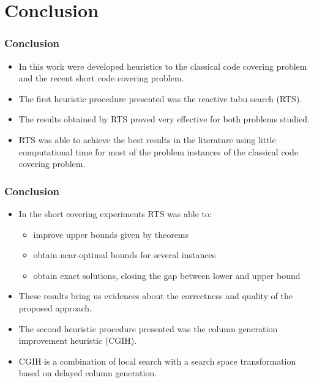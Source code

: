 \documentclass{beamer}
\begin{document}
\section{Conclusion}

\begin{frame}
  \frametitle{Conclusion}
{
	
\begin{itemize}
	\item<1-> In this work were developed heuristics to the classical code covering problem and the recent short code covering problem.
	\item<2-> The first heuristic procedure presented was the reactive tabu search (RTS).
	\item<3-> The results obtained by RTS proved very effective for both problems studied.
	\item<4-> RTS was able to achieve the best results in the literature using little computational time for most of the problem instances of the classical code covering problem.	
\end{itemize}

}
\end{frame}

\begin{frame}
  \frametitle{Conclusion}
{
	
\begin{itemize}
  	\item<1-> In the short covering experiments RTS was able to:
	\begin{itemize}
		\item<2-> improve upper bounds given by theorems
		\item<3-> obtain near-optimal bounds for several instances
		\item<4-> obtain exact solutions, closing the gap between lower and upper bound
	\end{itemize} 	
	\item<5-> These results bring us evidences about the correctness and quality of the proposed approach.	
	\item<6-> The second heuristic procedure presented was the column generation improvement heuristic (CGIH).
	\item<7-> CGIH is a combination of local search with a search space transformation based on delayed column generation.	
\end{itemize}

}
\end{frame}
\end{document}
